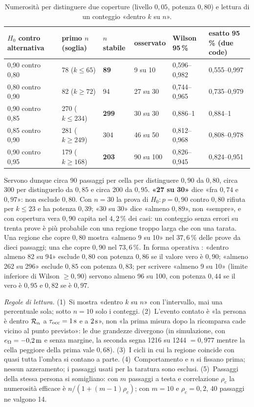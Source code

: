 \begin{table}[H]\centering\footnotesize
\caption{Numerosità per distinguere due coperture (livello $0{,}05$, potenza $0{,}80$) e lettura di un conteggio «dentro $k$ su $n$». }\label{tab:val-numerosita}
\begin{tabular}{@{}lll@{\hspace{2.2em}}lll@{}}
\toprule
$H_0$ contro alternativa & primo $n$ (soglia) & $n$ stabile & osservato & Wilson 95\,\% & esatto 95\,\% (due code)\\
\midrule
0,90 contro 0,80 & 78 ($k\le65$) & \textbf{89} & 9 su 10 & 0,596–0,982 & 0,555–0,997\\
0,80 contro 0,90 & 82 ($k\ge72$) & 94 & 27 su 30 & 0,744–0,965 & 0,735–0,979\\
0,90 contro 0,85 & 270 ($k\le234$) & \textbf{299} & 30 su 30 & 0,886–1 & 0,884–1\\
0,85 contro 0,90 & 281 ($k\ge249$) & 304 & 46 su 50 & 0,812–0,968 & 0,808–0,978\\
0,90 contro 0,95 & 179 ($k\ge168$) & \textbf{203} & 90 su 100 & 0,826–0,945 & 0,824–0,951\\
\bottomrule
\end{tabular}
\end{table}

Servono dunque circa 90 passaggi per cella per distinguere $0{,}90$ da $0{,}80$, circa 300 per distinguerlo da $0{,}85$ e circa 200 da $0{,}95$. \textbf{«27 su 30»} dice «fra $0{,}74$ e $0{,}97$»: non esclude $0{,}80$. Con $n=30$ la prova di $H_0\colon p=0{,}90$ contro $0{,}80$ rifiuta per $k\le23$ e ha potenza $0{,}39$; «30 su 30» dice «almeno $0{,}89$», non «sempre», e con copertura vera $0{,}90$ capita nel $4{,}2\,\%$ dei casi: un conteggio senza errori su trenta prove è più probabile con una regione troppo larga che con una tarata. Una regione che copre $0{,}80$ mostra «almeno 9 su 10» nel $37{,}6\,\%$ delle prove da dieci passaggi; una che copre $0{,}90$ nel $73{,}6\,\%$. In forma operativa : «dentro almeno 82 su 94» esclude $0{,}80$ con potenza $0{,}86$ se il valore vero è $0{,}90$; «almeno 262 su 296» esclude $0{,}85$ con potenza $0{,}83$; per scrivere «almeno 9 su 10» (limite inferiore di Wilson $\ge0{,}90$) servono almeno 96 su 100, con potenza $0{,}44$ se il vero è $0{,}95$ e $0{,}82$ se è $0{,}97$.

\emph{Regole di lettura.} (1)~Si mostra «dentro $k$ su $n$» con l'intervallo, mai una percentuale sola; sotto $n=10$ solo i conteggi. (2)~L'evento contato è «la persona è dentro $\mathcal{R}_\alpha$ a $\tau_{\mathrm{occ}}=1\,\mathrm{s}$ e a $2\,\mathrm{s}$», non «la prima misura dopo la ricomparsa cade vicino al punto previsto»: le due grandezze divergono (in simulazione, con $e_\Omega=-0{,}2\,\mathrm{m}$ e senza margine, la seconda segna 1216 su 1244 $=0{,}977$ mentre la cella peggiore della prima vale $0{,}68$). (3)~I cicli in cui la regione coincide con quasi tutta l'ombra si contano a parte. (4)~Comportamento e $n$ si fissano prima; nessun azzeramento; i passaggi usati per la taratura sono esclusi. (5)~Passaggi della stessa persona si somigliano: con $m$ passaggi a testa e correlazione $\rho_c$ la numerosità efficace è $n/(1+(m-1)\rho_c)$; con $m=10$ e $\rho_c=0{,}2$, 40 passaggi ne valgono 14.

